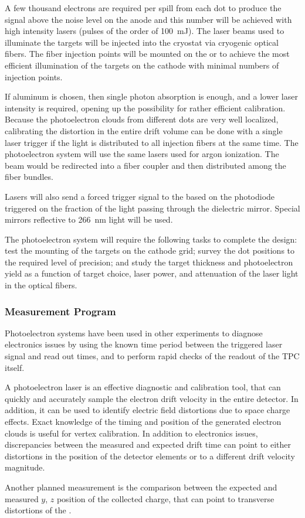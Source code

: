 A few thousand electrons are required per spill from each dot to produce the signal above the noise level on the anode and this number will be achieved with high intensity lasers (pulses of the order of \SI{100}{\milli\joule}). The laser beams used to illuminate the targets will be injected into the cryostat via cryogenic optical fibers. The fiber injection points will be mounted on the  or  to achieve the most efficient illumination of the targets on the cathode with minimal numbers of injection points. 

If aluminum is chosen, then single photon absorption is enough, and a lower laser intensity is required, opening up the possibility for rather efficient calibration.
Because the photoelectron clouds from different dots are very well localized, calibrating the \efield distortion in the entire drift volume can be done with a single laser trigger if the light is distributed to all injection fibers at the same time. 
The photoelectron system will use the same lasers used for argon ionization. 
The beam would be redirected into a fiber coupler and then distributed among the fiber bundles.


Lasers will also send a forced trigger signal to the  based on the photodiode triggered on the fraction of the light passing through the dielectric mirror. Special mirrors reflective to \SI{266}{\nano\m} light will be used. 

The photoelectron system will require the following tasks to complete the design: test the mounting of the targets on the cathode grid; survey the dot positions to the required level of precision; and study the target thickness and photoelectron yield as a function of target choice, laser power, and attenuation of the laser light in the optical fibers.

\subsubsection{Measurement Program}
\label{sec:sp-calib-sys-las-pe-meas}

Photoelectron systems have been used in other experiments to diagnose electronics issues by using the known time period between the triggered laser signal and read out times, and to perform rapid checks of the readout of the TPC itself. 

A photoelectron laser is an effective diagnostic and calibration tool, that can quickly and accurately sample the electron drift velocity in the entire detector.
In addition, it can be used to identify electric field distortions due to space charge effects. Exact knowledge of the timing and position of the generated electron clouds is useful for vertex calibration.
In addition to electronics issues, discrepancies between the measured and expected drift time can point to either distortions in the position of the detector elements or to a different drift velocity magnitude. 

Another planned measurement is the comparison between the expected and measured $y$, $z$ position of the collected charge, that can point to transverse distortions of the \efield.

